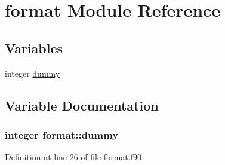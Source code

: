 \hypertarget{namespaceformat}{
\section{format Module Reference}
\label{namespaceformat}
}
\subsection*{Variables}
\begin{DoxyCompactItemize}
\item 
integer \hyperlink{namespaceformat_a35a6cb9f260951fd6bd7ba9144cfaf5e}{dummy}
\end{DoxyCompactItemize}


\subsection{Variable Documentation}
\hypertarget{namespaceformat_a35a6cb9f260951fd6bd7ba9144cfaf5e}{
\subsubsection[{dummy}]{\setlength{\rightskip}{0pt plus 5cm}integer {\bf format::dummy}}}
\label{namespaceformat_a35a6cb9f260951fd6bd7ba9144cfaf5e}


Definition at line 26 of file format.f90.

